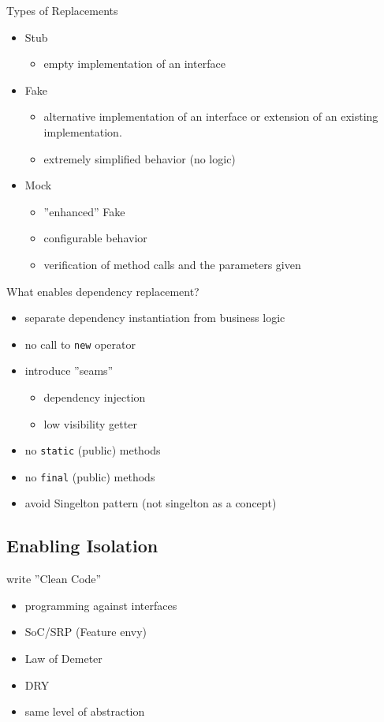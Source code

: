 \documentclass[SoftwareQuality.tex]{subfiles}
\begin{document}
\begin{frame}{Types of Replacements} 
	\begin{itemize}
	\item Stub
		\begin{itemize}
			\item empty implementation of an interface 
		\end{itemize}
		\vfill
	\item Fake
		\begin{itemize}
			\item alternative implementation of an interface or extension of an existing implementation.
			\item extremely simplified behavior (no logic)
		\end{itemize}
	\item Mock
		\begin{itemize}
			\item ''enhanced'' Fake
			\item configurable behavior
			\item verification of method calls and the parameters given
		\end{itemize}
	\end{itemize}
\end{frame}

\begin{frame}{What enables dependency replacement?} 
	\begin{itemize}
		\item separate dependency instantiation from business logic
		\item no call to \texttt{new} operator
		\item introduce ''seams''
			\begin{itemize}
				\item dependency injection
				\item low visibility getter
			\end{itemize}
		\item no \texttt{static} (public) methods
		\item no \texttt{final} (public) methods
		\item avoid Singelton pattern (not singelton as a concept)
	\end{itemize}
\end{frame}

\subsection*{Enabling Isolation}
\begin{frame}{write ''Clean Code''\footnotemark[1]} 
	\begin{itemize}
		\item programming against interfaces
		\item SoC/SRP (Feature envy)
		\item Law of Demeter
		\item DRY
		\item same level of abstraction
	\end{itemize}
\end{frame}
\end{document}
